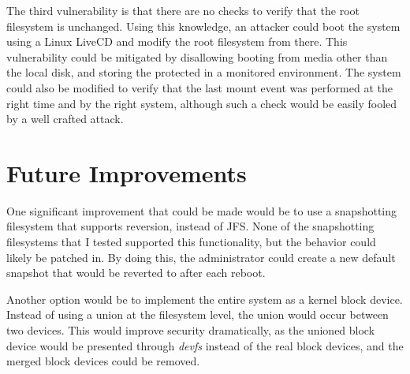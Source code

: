 \documentclass[12pt]{article}
\begin{document}
The third vulnerability is that there are no checks to verify that the root
filesystem is unchanged.  Using this knowledge, an attacker could boot the 
system using a Linux LiveCD and modify the root filesystem from there.  
This vulnerability could be mitigated by disallowing booting from media other 
than the local disk, and storing the protected in a monitored environment. 
The system could also be modified to verify that the last mount event 
was performed at the right time and by the right system, although such a check
would be easily fooled by a well crafted attack.  

\section{Future Improvements}
One significant improvement that could be made would be to use a snapshotting
filesystem that supports reversion, instead of JFS.  None of the snapshotting
filesystems that I tested supported this functionality, but the behavior could
likely be patched in. By doing this, the administrator could create a new
default snapshot that would be reverted to after each reboot.  

Another option would be to implement the entire system as a kernel block
device.  Instead of using a union at the filesystem level, the union would
occur between two devices.  This would improve security dramatically, as the
unioned block device would be presented through \emph{devfs} instead of the
real block devices, and the merged block devices could be removed.

\nocite{5350011,1520898,4595934}
\newpage



\end{document}
